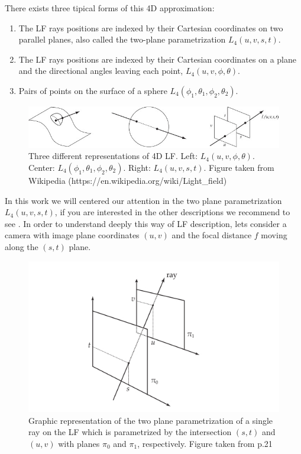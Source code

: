 \bigskip 

 There exists three tipical forms of this 4D approximation: 
\begin{enumerate}
\item The LF rays positions are indexed by their Cartesian coordinates on two parallel planes, also called the two-plane parametrization $L_4(u,v,s,t)$.
\item The LF rays positions are indexed by their Cartesian coordinates on a plane and the directional angles leaving each point, $L_4(u,v,\phi,\theta)$.
\item Pairs of points on the surface of a sphere $L_4(\phi_1,\theta_1,\phi_2,\theta_2)$.
\end{enumerate}

\bigskip

\begin{figure}[h!]
\centering
\includegraphics[width=1.0\textwidth]{./Diagrams/Light-field-parametrizations.jpg}
\caption{Three different representations of 4D LF\@. Left: $L_4(u,v,\phi,\theta)$. Center: $L_4(\phi_1,\theta_1,\phi_2,\theta_2)$. Right: $L_4(u,v,s,t)$. Figure taken from Wikipedia (https://en.wikipedia.org/wiki/Light\_field)}
\end{figure}

\bigskip

In this work we will centered our attention in the two plane parametrization $L_4(u,v,s,t)$, if you are interested in the other descriptions we recommend to see \cite{Liang}. In order to understand deeply this way of LF description, lets consider a camera with image plane coordinates $(u,v)$ and the focal distance $f$ moving along the $(s,t)$ plane. 

\bigskip

\begin{figure}[h!]
\centering
\includegraphics[width=1.0\textwidth]{./Diagrams/two-planes_param.jpg}
\caption{Graphic representation of the two plane parametrization of a single ray on the LF which is parametrized by the intersection $(s,t)$ and $(u,v)$ with planes $\pi_0$ and $\pi_1$, respectively. Figure taken from \cite{Kim-Disney} p.21}
\label{fig:C2S0F3}
\end{figure}

